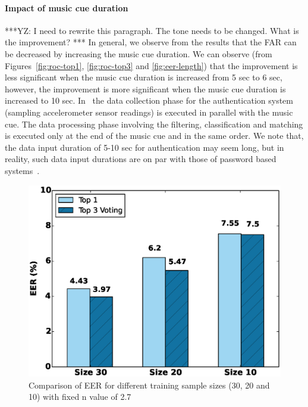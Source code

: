 \paragraph{Impact of music cue duration}

***YZ: I need to rewrite this paragraph. The tone needs to be changed. What is the improvement? ***
In general, we observe from the results that the FAR can
be decreased by increasing the music cue duration.
We can observe (from Figures~\ref{fig:roc-top1}, \ref{fig:roc-top3} and
\ref{fig:eer-length}) that the improvement is less significant when the music
cue duration is increased from 5 sec to 6 sec, however, the improvement is
more
significant when the music cue duration is increased to 10 sec.
In \systemname~the data collection phase for the authentication system
(sampling accelerometer sensor readings) is executed in parallel with the
music cue. The data processing phase involving the filtering, classification
and matching is executed only at the end of the music cue and in the same
order.
We note that, the data input duration of 5-10 sec for authentication
may seem long, but in reality, such data input durations are on par with those
of password based systems~\cite{von2013patterns}.

\begin{figure}[t]
\centering
\includegraphics [width=\columnwidth]{figure/exp2_vary_size.eps}
\caption{Comparison of EER for different training sample sizes (30, 20 and 10)
with fixed n value of 2.7}
\label{fig:eer-size}
\end{figure}


